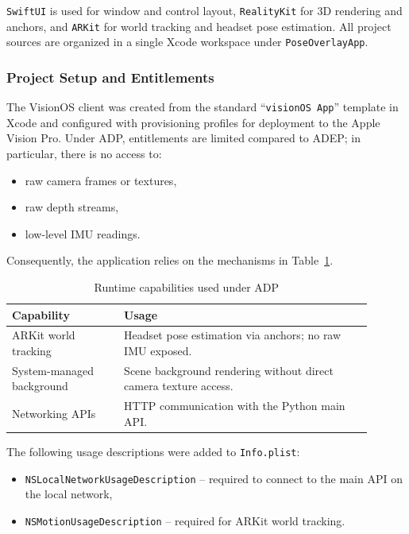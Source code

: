 \texttt{SwiftUI} is used for window and control layout, \texttt{RealityKit} for 3D rendering and anchors, and \texttt{ARKit} for world tracking and headset pose estimation. All project sources are organized in a single Xcode workspace under \texttt{PoseOverlayApp}.

\subsubsection{Project Setup and Entitlements}

The VisionOS client was created from the standard “\texttt{visionOS App}” template in Xcode and configured with provisioning profiles for deployment to the Apple Vision Pro. Under ADP, entitlements are limited compared to ADEP; in particular, there is no access to:

\begin{itemize}
    \item raw camera frames or textures,
    \item raw depth streams,
    \item low-level IMU readings.
\end{itemize}

Consequently, the application relies on the mechanisms in Table~\ref{tab:entitlements-dev}.

\begin{table}[H]
    \centering
    \caption{Runtime capabilities used under ADP}
    \label{tab:entitlements-dev}
    \begin{tabular}{p{0.28\linewidth}p{0.62\linewidth}}
        \toprule
        \textbf{Capability} & \textbf{Usage} \\
        \midrule
        ARKit world tracking &
        Headset pose estimation via anchors; no raw IMU exposed. \\
        System-managed background &
        Scene background rendering without direct camera texture access. \\
        Networking APIs &
        HTTP communication with the Python main API. \\
        \bottomrule
    \end{tabular}
\end{table}

The following usage descriptions were added to \texttt{Info.plist}:

\begin{itemize}
    \item \texttt{NSLocalNetworkUsageDescription} – required to connect to the main API on the local network,
    \item \texttt{NSMotionUsageDescription} – required for ARKit world tracking.
\end{itemize}

